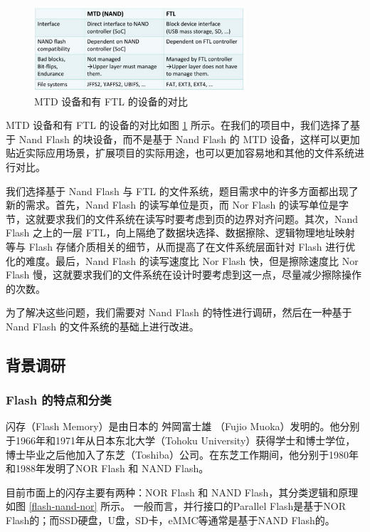 \begin{figure}[htbp]
  \centering
  \includegraphics[width=0.7\textwidth]{fig/flash-mtd-ftl.png}
  \caption{MTD 设备和有 FTL 的设备的对比}
  \label{flash-mtd-ftl}
\end{figure}

MTD 设备和有 FTL 的设备的对比如图 \ref{flash-mtd-ftl} 所示。在我们的项目中，我们选择了基于 Nand Flash 的块设备，而不是基于 Nand Flash 的 MTD 设备，这样可以更加贴近实际应用场景，扩展项目的实际用途，也可以更加容易地和其他的文件系统进行对比。

我们选择基于 Nand Flash 与 FTL 的文件系统，题目需求中的许多方面都出现了新的需求。首先，Nand Flash 的读写单位是页，而 Nor Flash 的读写单位是字节，这就要求我们的文件系统在读写时要考虑到页的边界对齐问题。其次，Nand Flash 之上的一层 FTL，向上隔绝了数据块选择、数据擦除、逻辑物理地址映射等与 Flash 存储介质相关的细节，从而提高了在文件系统层面针对 Flash 进行优化的难度。最后，Nand Flash 的读写速度比 Nor Flash 快，但是擦除速度比 Nor Flash 慢，这就要求我们的文件系统在设计时要考虑到这一点，尽量减少擦除操作的次数。

为了解决这些问题，我们需要对 Nand Flash 的特性进行调研，然后在一种基于 Nand Flash 的文件系统的基础上进行改进。

\subsection{背景调研}

\subsubsection{Flash 的特点和分类}

闪存（Flash Memory）是由日本的 舛岡富士雄 （Fujio Muoka）发明的。他分别于1966年和1971年从日本东北大学（Tohoku University）获得学士和博士学位，博士毕业之后他加入了东芝（Toshiba）公司。在东芝工作期间，他分别于1980年和1988年发明了NOR Flash 和 NAND Flash。

目前市面上的闪存主要有两种：NOR Flash 和 NAND Flash，其分类逻辑和原理如图 \ref {flash-nand-nor} 所示。
一般而言，并行接口的Parallel Flash是基于NOR Flash的；而SSD硬盘，U盘，SD卡，eMMC等通常是基于NAND Flash的。

